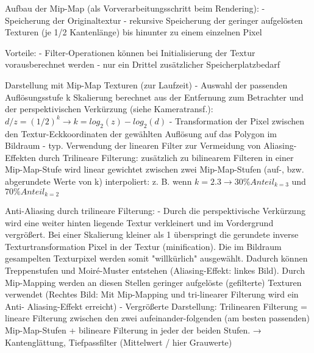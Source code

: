 \documentclass[10pt,landscape]{article}
\begin{document}
\begin{multicols}{3}
Aufbau der Mip-Map (als Vorverarbeitungsschritt beim Rendering):
- Speicherung der Originaltextur
- rekursive Speicherung der geringer aufgelösten Texturen (je 1/2 Kantenlänge) bis hinunter zu einem einzelnen Pixel

Vorteile:
- Filter-Operationen können bei Initialisierung der Textur vorausberechnet werden
- nur ein Drittel zusätzlicher Speicherplatzbedarf

Darstellung mit Mip-Map Texturen (zur Laufzeit)
- Auswahl der passenden Auflösungsstufe k Skalierung berechnet aus der Entfernung zum Betrachter und der perspektivischen Verkürzung (siehe Kameratransf.): $d/z = (1/2)^k \rightarrow k = log_2(z)-log_2(d)$
- Transformation der Pixel zwischen den Textur-Eckkoordinaten der gewählten Auflösung auf das Polygon im Bildraum
- typ. Verwendung der linearen Filter zur Vermeidung von Aliasing-Effekten durch Trilineare Filterung: zusätzlich zu bilinearem Filteren in einer Mip-Map-Stufe wird linear gewichtet zwischen zwei Mip-Map-Stufen (auf-, bzw. abgerundete Werte von k) interpoliert: z. B. wenn $k = 2.3 \rightarrow 30\% Anteil_{k=3}$ und $70\% Anteil_{k=2}$


Anti-Aliasing durch trilineare Filterung:
- Durch die perspektivische Verkürzung wird eine weiter hinten liegende Textur verkleinert und im Vordergrund vergrößert. Bei einer Skalierung kleiner als 1 überspringt die gerundete inverse Texturtransformation Pixel in der Textur (minification). Die im Bildraum gesampelten Texturpixel werden somit "willkürlich" ausgewählt. Dadurch können Treppenstufen und Moiré-Muster entstehen (Aliasing-Effekt: linkes Bild). Durch Mip-Mapping werden an diesen Stellen geringer aufgelöste (gefilterte) Texturen verwendet (Rechtes Bild: Mit Mip-Mapping und tri-linearer Filterung wird ein Anti- Aliasing-Effekt erreicht)
- Vergrößerte Darstellung: Trilinearen Filterung = lineare Filterung zwischen den zwei aufeinander-folgenden (am besten passenden) Mip-Map-Stufen + bilineare Filterung in jeder der beiden Stufen. → Kantenglättung, Tiefpassfilter (Mittelwert / hier Grauwerte)



\end{multicols}
\end{document}
